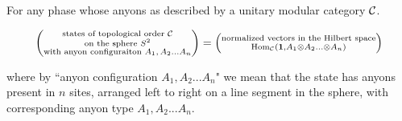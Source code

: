 \begin{dict} For any phase whose anyons as described by a unitary modular category ${\mathcal C}$.

\begin{equation}\label{dict-state-formula}
\left(\substack{\text{states of topological order ${\mathcal C}$} \\ \text{on the sphere $S^2$} \\ \text{with anyon configuraiton $A_1,A_2...A _n$}}\right)
=
\left(
\substack{
\text{normalized vectors in the Hilbert space}\\
\operatorname{Hom}_{\mathcal C}({\mathbf 1}, A_1\otimes A_2... \otimes A_n)
}
\right)
\end{equation}

where by ``anyon configuration $A_1,A_2...A_n$" we mean that the state has anyons present in $n$ sites, arranged left to right on a line segment in the sphere, with corresponding anyon type $A_1,A_2...A_n$.
\end{dict}

